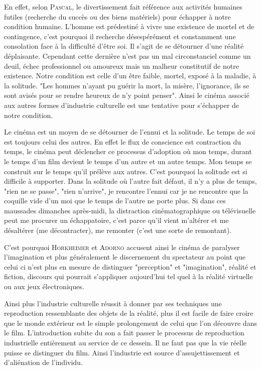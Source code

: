 \documentclass[a4paper,14pt]{extreport}
\begin{document}
En effet, selon \textsc{Pascal}, le divertissement fait référence aux activités humaines futiles (recherche du succès ou des biens matériels) pour échapper à notre condition humaine. L'homme est prédestiné à vivre une existence de mortel et de contingence, c'est pourquoi il recherche désespérément et constamment une consolation face à la difficulté d’être soi. Il s'agit de se détourner d'une réalité déplaisante. Cependant cette dernière n'est pas un mal circonstanciel comme un deuil, échec professionnel ou amoureux mais un malheur constitutif de notre existence. Notre condition est celle d'un être faible, mortel, exposé à la maladie, à la solitude. "Les hommes n'ayant pu guérir la mort, la misère, l'ignorance, ils se sont avisés pour se rendre heureux de n'y point penser". Ainsi le cinéma associé aux autres formes d'industrie culturelle est une tentative pour s'échapper de notre condition. 

Le cinéma est un moyen de se détourner de l'ennui et la solitude. Le temps de soi est toujours celui des autres. En effet le flux de conscience est contraction du temps, le cinéma peut déclencher ce processus d'adoption où mon temps, durant le temps d'un film devient le temps d'un autre et un autre temps. Mon temps se construit sur le temps qu'il prélève aux autres. C'est pourquoi la solitude est si difficile à supporter. Dans la solitude où l'autre fait défaut, il n'y a plus de temps, "rien ne se passe", "rien n'arrive", je rencontre l'ennui car je ne rencontre que la coquille vide d'un moi que le temps de l'autre ne porte plus. Si dans ces maussades dimanches après-midi, la distraction cinématographique ou télévisuelle peut me procurer un échappatoire, c'est parce qu'il vient m'altérer et me désaltérer (me décontracter), me remonter (c'est une sorte de remontant).

C'est pourquoi \textsc{Horkheimer} et \textsc{Adorno} accusent ainsi le cinéma de paralyser l'imagination et plus généralement le discernement du spectateur au point que celui ci n’est plus en mesure de distinguer "perception" et "imagination", réalité et fiction, discours qui pourrait s'appliquer aujourd'hui tel quel à la réalité virtuelle ou aux jeux électroniques. 

Ainsi plus l'industrie culturelle réussit à donner par ses techniques une reproduction ressemblante des objets de la réalité, plus il est facile de faire croire que le monde extérieur est le simple prolongement de celui que l'on découvre dans le film. L'introduction subite du son a fait passer le processus de reproduction industrielle entièrement au service de ce dessein. Il ne faut pas que la vie réelle puisse se distinguer du film. Ainsi l'industrie est source d’assujettissement et d'aliénation de l'individu.
\end{document}
